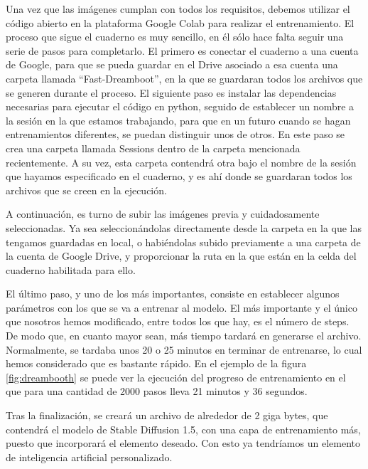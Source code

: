 Una vez que las imágenes cumplan con todos los requisitos, debemos utilizar el código abierto en la plataforma Google Colab para realizar el entrenamiento. 
El proceso que sigue el cuaderno es muy sencillo, en él sólo hace falta seguir una serie de pasos para completarlo. El primero es conectar el cuaderno a una cuenta de Google, para que se pueda guardar en el Drive asociado a esa cuenta una carpeta llamada ``Fast-Dreamboot'', en la que se guardaran todos los archivos que se generen durante el proceso. El siguiente paso es instalar las dependencias necesarias para ejecutar el código en python, seguido de establecer un nombre a la sesión en la que estamos trabajando, para que en un futuro cuando se hagan entrenamientos diferentes, se puedan distinguir unos de otros. En este paso se crea una carpeta llamada Sessions dentro de la carpeta mencionada recientemente. A su vez, esta carpeta contendrá otra bajo el nombre de la sesión que hayamos especificado en el cuaderno, y es ahí donde se guardaran todos los archivos que se creen en la ejecución. 

A continuación, es turno de subir las imágenes previa y cuidadosamente seleccionadas. Ya sea seleccionándolas directamente desde la carpeta en la que las tengamos guardadas en local, o habiéndolas subido previamente a una carpeta de la cuenta de Google Drive, y proporcionar la ruta en la que están en la celda del cuaderno habilitada para ello. 

El último paso, y uno de los más importantes, consiste en establecer algunos parámetros con los que se va a entrenar al modelo. El más importante y el único que nosotros hemos modificado, entre todos los que hay, es el número de steps. De modo que, en cuanto mayor sean, más tiempo tardará en generarse el archivo. Normalmente, se tardaba unos 20 o 25 minutos en terminar de entrenarse, lo cual hemos considerado que es bastante rápido. En el ejemplo de la figura \ref{fig:dreambooth} se puede ver la ejecución del progreso de entrenamiento en el que para una cantidad de 2000 pasos lleva 21 minutos y 36 segundos. 

Tras la finalización, se creará un archivo de alrededor de 2 giga bytes, que contendrá el modelo de Stable Diffusion 1.5, con una capa de entrenamiento más, puesto que incorporará el elemento deseado. Con esto ya tendríamos un elemento de inteligencia artificial personalizado.\\

